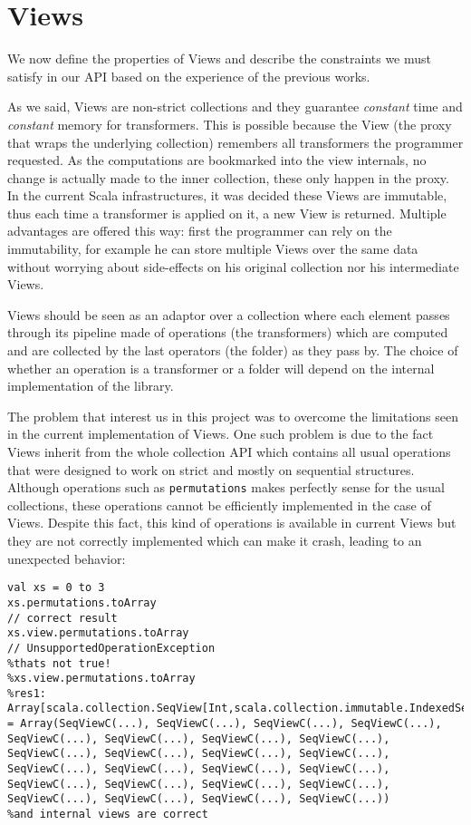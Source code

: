 \documentclass[a4paper,12pt,twocolumn]{article}
\begin{document}
\section{Views}
We now define the properties of Views and describe the constraints we must satisfy in our API based on the experience of the previous works.

As we said, Views are non-strict collections and they guarantee {\it constant} time and {\it constant} memory for transformers.
This is possible because the View (the proxy that wraps the underlying collection) remembers all transformers the programmer requested.
As the computations are bookmarked into the view internals, no change is actually made to the inner collection, these only happen in the proxy.
In the current Scala infrastructures, it was decided these Views are immutable, thus each time a transformer is applied on it, a new View is returned.
Multiple advantages are offered this way: first the programmer can rely on the immutability, for example he can store multiple Views over the same data without worrying about side-effects on his original collection nor his intermediate Views.

Views should be seen as an adaptor over a collection where each element passes through its pipeline made of operations (the transformers) which are computed and are collected by the last operators (the folder) as they pass by.
The choice of whether an operation is a transformer or a folder will depend on the internal implementation of the library.

The problem that interest us in this project was to overcome the limitations seen in the current implementation of Views.
One such problem is due to the fact Views inherit from the whole collection API which contains all usual operations that were designed to work on strict and mostly on sequential structures.
Although operations such as \verb|permutations| makes perfectly sense for the usual collections, these operations cannot be efficiently implemented in the case of Views.%
Despite this fact, this kind of operations is available in current Views but they are not correctly implemented which can make it crash, leading to an unexpected behavior:%

\begin{lstlisting}
val xs = 0 to 3
xs.permutations.toArray
// correct result
xs.view.permutations.toArray
// UnsupportedOperationException
%thats not true!
%xs.view.permutations.toArray
%res1: Array[scala.collection.SeqView[Int,scala.collection.immutable.IndexedSeq[Int]]] = Array(SeqViewC(...), SeqViewC(...), SeqViewC(...), SeqViewC(...), SeqViewC(...), SeqViewC(...), SeqViewC(...), SeqViewC(...), SeqViewC(...), SeqViewC(...), SeqViewC(...), SeqViewC(...), SeqViewC(...), SeqViewC(...), SeqViewC(...), SeqViewC(...), SeqViewC(...), SeqViewC(...), SeqViewC(...), SeqViewC(...), SeqViewC(...), SeqViewC(...), SeqViewC(...), SeqViewC(...))
%and internal views are correct
\end{lstlisting}
\end{document}
